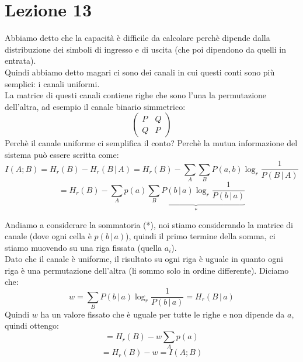 \section*{Lezione 13}

Abbiamo detto che la capacità è difficile da calcolare perchè dipende dalla distribuzione dei simboli di ingresso e di uscita (che poi dipendono da quelli in entrata).\\
Quindi abbiamo detto magari ci sono dei canali in cui questi conti sono più semplici: i canali uniformi.\\
La matrice di questi canali contiene righe che sono l'una la permutazione dell'altra, ad esempio il canale binario simmetrico:
\begin{equation*}
\begin{pmatrix}
P & Q\\
Q & P
\end{pmatrix}
\end{equation*}
Perchè il canale uniforme ci semplifica il conto? Perchè la mutua informazione del sistema può essere scritta come:
\begin{equation*}
I(A;B)= H_r(B)-H_r(B\,|\,A) = H_r(B) - \sum_{A}\sum_{B}P(a,b)\log_r\frac{1}{P(B\,|\,A)}
\end{equation*}
\begin{equation*}
= H_r(B) - \sum_{A}p(a)\underbrace{\sum_{B}P(b\,|\,a)\log_r\frac{1}{P(b\,|\,a)}}_{\text{*}}
\end{equation*}

Andiamo a considerare la sommatoria (*), noi stiamo considerando la matrice di canale (dove ogni cella è $p(b\,|\,a)$), quindi il primo termine della somma, ci stiamo muovendo su una riga fissata (quella $a_i$).\\
Dato che il canale è uniforme, il risultato su ogni riga è uguale in quanto ogni riga è una permutazione dell'altra (li sommo solo in ordine differente).
Diciamo che:
\begin{equation*}
w = \sum_{B}P(b\,|\,a)\log_r\frac{1}{P(b\,|\,a)} = H_r(B\,|\,a)
\end{equation*}
Quindi $w$ ha un valore fissato che è uguale per tutte le righe e non dipende da $a$, quindi ottengo:
\begin{equation*}
= H_r(B) - w \sum_{A}p(a)
\end{equation*}
\begin{equation*}
= H_r(B) - w = I(A;B)
\end{equation*}

